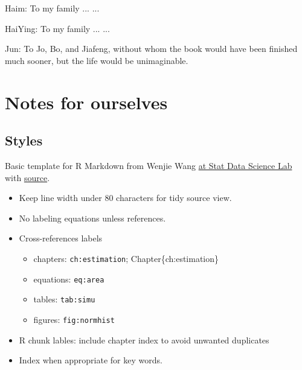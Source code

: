 \thispagestyle{empty}

\begin{center}
  Haim: To my family ... ...
  

  \bigskip

  HaiYing: To my family ... ...

  \bigskip

  Jun: To Jo, Bo, and Jiafeng, without whom the book would have been finished
  much sooner, but the life would be unimaginable.
  
\end{center}

\setlength{\abovedisplayskip}{-5pt}
\setlength{\abovedisplayshortskip}{-5pt}

{
\hypersetup{linkcolor=}
\setcounter{tocdepth}{2}
\tableofcontents
}

\hypertarget{notes-for-ourselves}{%
\chapter*{Notes for ourselves}\label{notes-for-ourselves}}


\hypertarget{styles}{%
\section*{Styles}\label{styles}}


Basic template for R Markdown from Wenjie Wang
\href{https://statds.org/template/}{at Stat Data Science Lab} with
\href{https://github.com/statds/dslab-templates/}{source}.

\begin{itemize}
\tightlist
\item
  Keep line width under 80 characters for tidy source view.
\item
  No labeling equations unless references.
\item
  Cross-references labels

  \begin{itemize}
  \tightlist
  \item
    chapters: \texttt{ch:estimation}; Chapter\textasciitilde@ref\{ch:estimation\}
  \item
    equations: \texttt{eq:area}
  \item
    tables: \texttt{tab:simu}
  \item
    figures: \texttt{fig:normhist}
  \end{itemize}
\item
  R chunk lables: include chapter index to avoid unwanted duplicates
\item
  Index when appropriate for key words.
\end{itemize}

